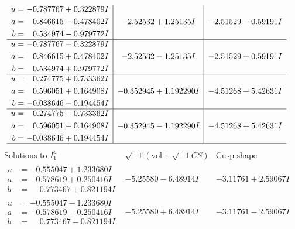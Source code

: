 \documentclass[1p]{elsarticle_modified}
\theoremstyle{definition}
\newcommand{\I}{\sqrt{-1}}
\begin{document}
$$\begin{array}{c|c|c}
\begin{aligned}
u &= -0.787767 + 0.322879 I \\
a &= \phantom{-}0.846615 - 0.478402 I \\
b &= \phantom{-}0.534974 - 0.979772 I\end{aligned}
 & -2.52532 + 1.25135 I & -2.51529 - 0.59191 I \\ \hline\begin{aligned}
u &= -0.787767 - 0.322879 I \\
a &= \phantom{-}0.846615 + 0.478402 I \\
b &= \phantom{-}0.534974 + 0.979772 I\end{aligned}
 & -2.52532 - 1.25135 I & -2.51529 + 0.59191 I \\ \hline\begin{aligned}
u &= \phantom{-}0.274775 + 0.733362 I \\
a &= \phantom{-}0.596051 + 0.164908 I \\
b &= -0.038646 - 0.194454 I\end{aligned}
 & -0.352945 + 1.192290 I & -4.51268 - 5.42631 I \\ \hline\begin{aligned}
u &= \phantom{-}0.274775 - 0.733362 I \\
a &= \phantom{-}0.596051 - 0.164908 I \\
b &= -0.038646 + 0.194454 I\end{aligned}
 & -0.352945 - 1.192290 I & -4.51268 + 5.42631 I\\
 \hline 
 \end{array}$$\newpage$$\begin{array}{c|c|c}  
\text{Solutions to }I^u_{1}& \I (\text{vol} + \sqrt{-1}CS) & \text{Cusp shape}\\
 \hline 
\begin{aligned}
u &= -0.555047 + 1.233680 I \\
a &= -0.578619 + 0.250416 I \\
b &= \phantom{-}0.773467 + 0.821194 I\end{aligned}
 & -5.25580 - 6.48914 I & -3.11761 + 2.59067 I \\ \hline\begin{aligned}
u &= -0.555047 - 1.233680 I \\
a &= -0.578619 - 0.250416 I \\
b &= \phantom{-}0.773467 - 0.821194 I\end{aligned}
 & -5.25580 + 6.48914 I & -3.11761 - 2.59067 I \\ \hline\begin{aligned}

\end{aligned}
\end{array}$$
\end{document}
